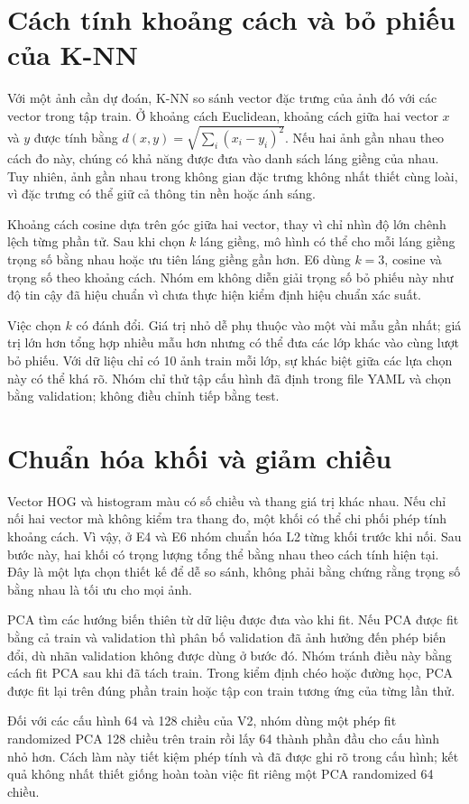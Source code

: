 \section{Cách tính khoảng cách và bỏ phiếu của K-NN}
Với một ảnh cần dự đoán, K-NN so sánh vector đặc trưng của ảnh đó với các vector trong tập train. Ở khoảng cách Euclidean, khoảng cách giữa hai vector $x$ và $y$ được tính bằng $d(x,y)=\sqrt{\sum_i(x_i-y_i)^2}$. Nếu hai ảnh gần nhau theo cách đo này, chúng có khả năng được đưa vào danh sách láng giềng của nhau. Tuy nhiên, ảnh gần nhau trong không gian đặc trưng không nhất thiết cùng loài, vì đặc trưng có thể giữ cả thông tin nền hoặc ánh sáng.

Khoảng cách cosine dựa trên góc giữa hai vector, thay vì chỉ nhìn độ lớn chênh lệch từng phần tử. Sau khi chọn $k$ láng giềng, mô hình có thể cho mỗi láng giềng trọng số bằng nhau hoặc ưu tiên láng giềng gần hơn. E6 dùng $k=3$, cosine và trọng số theo khoảng cách. Nhóm em không diễn giải trọng số bỏ phiếu này như độ tin cậy đã hiệu chuẩn vì chưa thực hiện kiểm định hiệu chuẩn xác suất.

Việc chọn $k$ có đánh đổi. Giá trị nhỏ dễ phụ thuộc vào một vài mẫu gần nhất; giá trị lớn hơn tổng hợp nhiều mẫu hơn nhưng có thể đưa các lớp khác vào cùng lượt bỏ phiếu. Với dữ liệu chỉ có 10 ảnh train mỗi lớp, sự khác biệt giữa các lựa chọn này có thể khá rõ. Nhóm chỉ thử tập cấu hình đã định trong file YAML và chọn bằng validation; không điều chỉnh tiếp bằng test.
\section{Chuẩn hóa khối và giảm chiều}
Vector HOG và histogram màu có số chiều và thang giá trị khác nhau. Nếu chỉ nối hai vector mà không kiểm tra thang đo, một khối có thể chi phối phép tính khoảng cách. Vì vậy, ở E4 và E6 nhóm chuẩn hóa L2 từng khối trước khi nối. Sau bước này, hai khối có trọng lượng tổng thể bằng nhau theo cách tính hiện tại. Đây là một lựa chọn thiết kế để dễ so sánh, không phải bằng chứng rằng trọng số bằng nhau là tối ưu cho mọi ảnh.

PCA tìm các hướng biến thiên từ dữ liệu được đưa vào khi fit. Nếu PCA được fit bằng cả train và validation thì phân bố validation đã ảnh hưởng đến phép biến đổi, dù nhãn validation không được dùng ở bước đó. Nhóm tránh điều này bằng cách fit PCA sau khi đã tách train. Trong kiểm định chéo hoặc đường học, PCA được fit lại trên đúng phần train hoặc tập con train tương ứng của từng lần thử.

Đối với các cấu hình 64 và 128 chiều của V2, nhóm dùng một phép fit randomized PCA 128 chiều trên train rồi lấy 64 thành phần đầu cho cấu hình nhỏ hơn. Cách làm này tiết kiệm phép tính và đã được ghi rõ trong cấu hình; kết quả không nhất thiết giống hoàn toàn việc fit riêng một PCA randomized 64 chiều.
